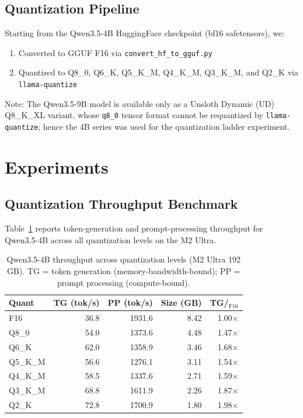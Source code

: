 \documentclass[11pt,a4paper]{article}
\begin{document}
\subsection{Quantization Pipeline}

Starting from the Qwen3.5-4B HuggingFace checkpoint (bf16 safetensors), we:
{\sloppy
\begin{enumerate}
  \item Converted to GGUF F16 via \texttt{convert\_hf\_to\_gguf.py}
  \item Quantized to Q8\_0, Q6\_K, Q5\_K\_M, Q4\_K\_M, Q3\_K\_M,
        and Q2\_K via \texttt{llama-quantize}
\end{enumerate}
}

Note: The Qwen3.5-9B model is available only as a Unsloth Dynamic (UD) Q8\_K\_XL
variant, whose \texttt{q8\_0} tensor format cannot be requantized by
\texttt{llama-quantize}; hence the 4B series was used for the quantization
ladder experiment.

\section{Experiments}

\subsection{Quantization Throughput Benchmark}

Table~\ref{tab:quant_tg} reports token-generation and prompt-processing
throughput for Qwen3.5-4B across all quantization levels on the M2 Ultra.

\begin{table}[h]
\centering
\caption{Qwen3.5-4B throughput across quantization levels (M2 Ultra 192 GB).
TG = token generation (memory-bandwidth-bound);
PP = prompt processing (compute-bound).}
\label{tab:quant_tg}
\begin{tabular}{lrrrr}
\toprule
\textbf{Quant} & \textbf{TG (tok/s)} & \textbf{PP (tok/s)} & \textbf{Size (GB)} & \textbf{TG/$_{\text{F16}}$} \\
\midrule
F16     & 36.8  & 1931.6 & 8.42 & 1.00$\times$ \\
Q8\_0   & 54.0  & 1373.6 & 4.48 & 1.47$\times$ \\
Q6\_K   & 62.0  & 1358.9 & 3.46 & 1.68$\times$ \\
Q5\_K\_M & 56.6  & 1276.1 & 3.11 & 1.54$\times$ \\
Q4\_K\_M & 58.5  & 1337.6 & 2.71 & 1.59$\times$ \\
Q3\_K\_M & 68.8  & 1611.9 & 2.26 & 1.87$\times$ \\
Q2\_K   & 72.8  & 1700.9 & 1.80 & 1.98$\times$ \\
\bottomrule
\end{tabular}
\end{table}
\end{document}
